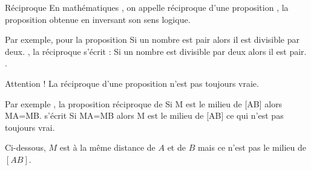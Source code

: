 \begin{activite}
    \begin{myBox}{Réciproque}
        En mathématiques , on appelle réciproque d'une proposition , la proposition obtenue en inversant son
        sens logique.\medskip

        Par exemple, pour la proposition \og Si un nombre est pair alors il est divisible par deux. \fg, la
        réciproque s'écrit : \og Si un nombre est divisible par deux alors il est pair. \fg.\medskip

        Attention ! La réciproque d'une proposition n'est pas toujours vraie.\smallskip

        Par exemple , la proposition réciproque de \og Si M est le milieu de [AB] alors MA=MB. \fg{}
        s'écrit \og Si MA=MB alors M est le milieu de [AB] \fg{} ce qui n'est pas toujours vrai.\smallskip

        Ci-dessous, $M$ est à la même distance de $A$ et de $B$ mais ce n'est pas le milieu de $[AB]$.\smallskip

    \end{myBox}


\end{activite}
